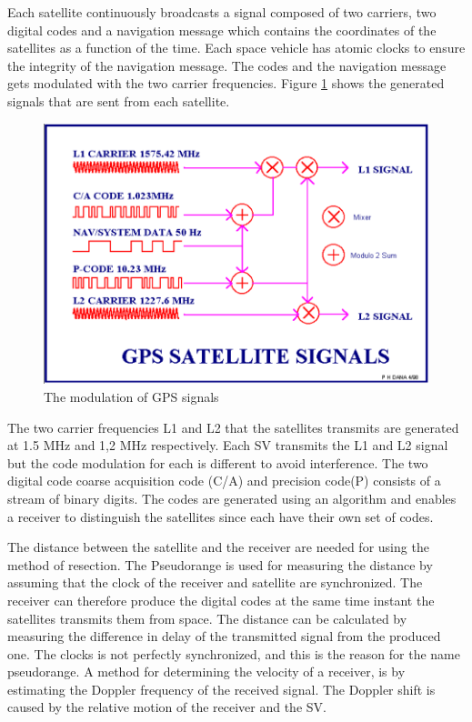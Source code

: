 Each satellite continuously broadcasts a signal composed of two carriers, two digital codes and a navigation message which contains the coordinates of the satellites as a function of the time. Each space vehicle has atomic clocks to ensure the integrity of the navigation message. The codes and the navigation message gets modulated with the two carrier frequencies.  Figure \ref{fig:modulation} shows the generated signals that are sent from each satellite.

 
 
 \begin{figure}[H]
\centering
\includegraphics[width=14 cm]{Project_Report/Images/satsignals.PNG}
\caption{The modulation of GPS signals\cite{GPSSIGNALS}}
\label{fig:modulation}
\end{figure}


The two carrier frequencies L1 and L2 that the satellites transmits are generated at 1.5 MHz and 1,2 MHz respectively.  Each SV transmits the L1 and L2 signal but the code modulation for each is different to avoid interference. The two digital code coarse acquisition code (C/A) and precision code(P) consists of a stream of binary digits. The codes are generated using an algorithm and enables a receiver to distinguish the satellites since each have their own set of codes.


The distance between the satellite and the receiver are needed for using the method of resection. The Pseudorange is used for measuring the distance by assuming that the clock of the receiver and satellite are synchronized. The receiver can therefore produce the digital codes at the same time instant the satellites transmits them from space. The distance can be calculated by measuring the difference in delay of the transmitted signal from the produced one. The clocks is not perfectly synchronized, and this is the reason for the name pseudorange.
A method for determining the velocity of a receiver, is by estimating the Doppler frequency of the received signal. The Doppler shift is caused by the relative motion of the receiver and the SV.
 
